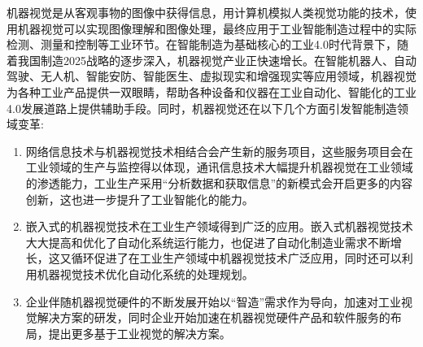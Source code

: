 机器视觉是从客观事物的图像中获得信息，用计算机模拟人类视觉功能的技术，使用机器视觉可以实现图像理解和图像处理，最终应用于工业智能制造过程中的实际检测、测量和控制等工业环节\cite{duanfeng2002}。在智能制造为基础核心的工业4.0时代背景下，随着我国制造2025战略的逐步深入，机器视觉产业正快速增长。在智能机器人、自动驾驶、无人机、智能安防、智能医生、虚拟现实和增强现实等应用领域，机器视觉为各种工业产品提供一双眼睛，帮助各种设备和仪器在工业自动化、智能化的工业4.0发展道路上提供辅助手段。同时，机器视觉还在以下几个方面引发智能制造领域变革\cite{ruan2017}:

\begin{enumerate}[(1)]

\item 网络信息技术与机器视觉技术相结合会产生新的服务项目，这些服务项目会在工业领域的生产与监控得以体现，通讯信息技术大幅提升机器视觉在工业领域的渗透能力，工业生产采用“分析数据和获取信息”的新模式会开启更多的内容创新，这也进一步提升了工业智能化的能力。

\item 嵌入式的机器视觉技术在工业生产领域得到广泛的应用。嵌入式机器视觉技术大大提高和优化了自动化系统运行能力，也促进了自动化制造业需求不断增长，这又循环促进了在工业生产领域中机器视觉技术广泛应用，同时还可以利用机器视觉技术优化自动化系统的处理规划。

\item 企业伴随机器视觉硬件的不断发展开始以“智造”需求作为导向，加速对工业视觉解决方案的研发，同时企业开始加速在机器视觉硬件产品和软件服务的布局，提出更多基于工业视觉的解决方案。

\end{enumerate}

